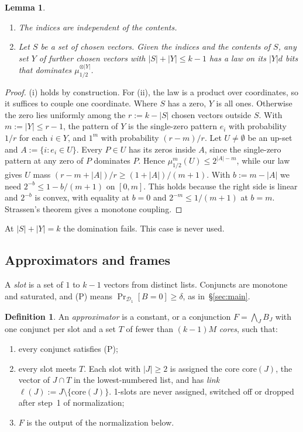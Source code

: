 \documentclass[11pt,a4paper]{article}
\theoremstyle{plain}
\newtheorem{lemma}[theorem]{Lemma}
\theoremstyle{definition}
\newtheorem{definition}[theorem]{Definition}
\theoremstyle{remark}
\newcommand{\Do}{\mathcal{D}_1}
\newcommand{\core}{\mathrm{core}}
\begin{document}
\begin{lemma}\label{lem:dom}
\begin{enumerate}[label=(\roman*)]
  \item The indices are independent of the contents.
  \item Let $S$ be a set of chosen vectors. Given the indices and the contents of $S$, any set $Y$ of further chosen
    vectors with $|S|+|Y|\le k-1$ has a law on its $|Y|d$ bits that dominates $\mu_{1/2}^{\otimes|Y|}$.
\end{enumerate}
\end{lemma}
\begin{proof}
(i) holds by construction. For (ii), the law is a product over coordinates, so it suffices to couple one coordinate.
Where $S$ has a zero, $Y$ is all ones. Otherwise the zero lies uniformly among the $r:=k-|S|$ chosen vectors outside
$S$. With $m:=|Y|\le r-1$, the pattern of $Y$ is the single-zero pattern $e_i$ with probability $1/r$ for each
$i\in Y$, and $1^m$ with probability $(r-m)/r$. Let $U\neq\emptyset$ be an up-set and $A:=\{i:e_i\in U\}$. Every
$P\in U$ has its zeros inside $A$, since the single-zero pattern at any zero of $P$ dominates $P$. Hence
$\mu_{1/2}^m(U)\le2^{|A|-m}$, while our law gives $U$ mass $(r-m+|A|)/r\ge(1+|A|)/(m+1)$. With $b:=m-|A|$ we need
$2^{-b}\le1-b/(m+1)$ on $[0,m]$. This holds because the right side is linear and $2^{-b}$ is convex, with equality at
$b=0$ and $2^{-m}\le1/(m+1)$ at $b=m$. Strassen's theorem gives a monotone coupling.
\end{proof}

At $|S|+|Y|=k$ the domination fails. This case is never used.

\subsection{Approximators and frames}
A \emph{slot} is a set of $1$ to $k-1$ vectors from distinct lists. Conjuncts are monotone and saturated, and (P)
means $\Pr_{\Do}[B=0]\ge\delta$, as in~\S\ref{sec:main}.

\begin{definition}\label{def:approxk}
An \emph{approximator} is a constant, or a conjunction $F=\bigwedge_JB_J$ with one conjunct per slot and a set $T$
of fewer than $(k-1)M$ \emph{cores}, such that:
\begin{enumerate}[label=(B\arabic*)]
  \item every conjunct satisfies (P);
  \item every slot meets $T$. Each slot with $|J|\ge2$ is assigned the core $\core(J)$, the vector of $J\cap T$ in the
    lowest-numbered list, and has \emph{link} $\ell(J):=J\setminus\{\core(J)\}$. 1-slots are never assigned, switched off or dropped after step~1 of
    normalization;
  \item $F$ is the output of the normalization below.
\end{enumerate}
\end{definition}
\end{document}

